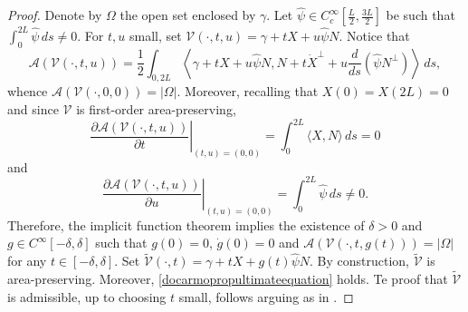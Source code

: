 \documentclass[11pt]{amsart}
\newcommand{\A}{\mathcal A}
\newcommand{\Om}{\Omega}
\theoremstyle{definition}
\theoremstyle{remark}
\numberwithin{equation}{section}
\begin{document}
	\begin{proof}
		Denote by $\Om$ the open set enclosed by $\gamma$.  Let $\hat\psi\in C^\infty_c\left[\frac{L}{2},\frac{3L}{2}\right]$ be such that 
		$\int_0^{2L}\hat\psi\,ds\neq 0$. For $t,u$ small, set $\mathcal V(\cdot,t,u)=\gamma+t X+u\hat\psi N$. Notice that
		\begin{equation*}
			\A\left(\mathcal V(\cdot,t,u)\right)=\frac{1}{2}\int_{0,2L}\left\langle\gamma+t X+u\hat\psi N,N+t\dot X^\perp+u\frac{d}{ds}\left(\hat\psi N^\perp\right)\right\rangle\,ds,
		\end{equation*}
		whence
		$\A\left(\mathcal V(\cdot,0,0)\right)=|\Om|$. Moreover, recalling that $X(0)=X(2L)=0$ and since $\mathcal V$ is first-order area-preserving,
		\begin{equation*}
			\left.\frac{\partial \A(\mathcal V(\cdot,t,u))}{\partial t}\right|_{(t,u)=(0,0)}=\int_0^{2L}\langle X,N\rangle\,ds=0  
		\end{equation*}
		and 
		\begin{equation*}
			\left.\frac{\partial \A(\mathcal V(\cdot,t,u))}{\partial u}\right|_{(t,u)=(0,0)}=\int_0^{2L}\hat \psi\,ds\neq 0.
		\end{equation*}
		Therefore, the implicit function theorem implies the existence of $\delta>0$ and $g\in C^\infty[-\delta,\delta]$ such that $g(0)=0$, $\dot g(0)=0$ and $\A(\mathcal V(\cdot,t,g(t)))=|\Om|$ for any $t\in[-\delta,\delta]$. Set $ \mathcal {\tilde V}(\cdot, t)=\gamma+tX+g(t)\hat\psi N$. By construction, $\mathcal {\tilde V}$ is area-preserving. Moreover, \eqref{docarmopropultimateequation} holds. Te proof that $ \mathcal {\tilde V}$ is admissible, up to choosing $t$ small, follows arguing as in .
	\end{proof}
\end{document}
